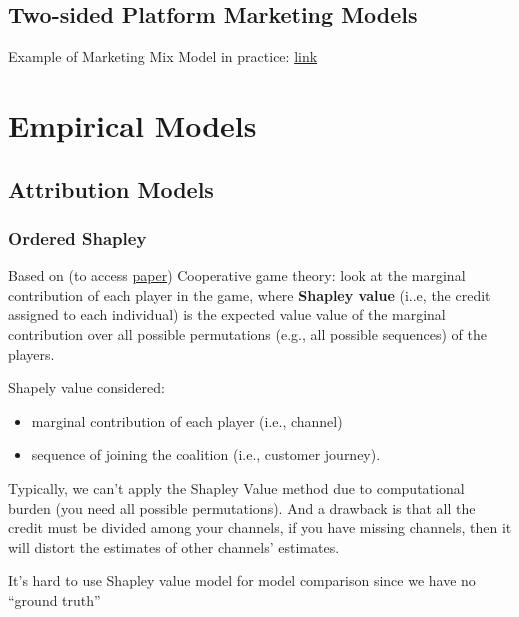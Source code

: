 \documentclass[
]{book}
\providecommand{\tightlist}{%
  \setlength{\itemsep}{0pt}\setlength{\parskip}{0pt}}
\begin{document}
\hypertarget{two-sided-platform-marketing-models}{%
\section{Two-sided Platform Marketing Models}\label{two-sided-platform-marketing-models}}

Example of Marketing Mix Model in practice: \href{http://datafeedtoolbox.com/marketing-mix-model-for-all-using-r-for-mmm/}{link}

\hypertarget{empirical-models}{%
\chapter{Empirical Models}\label{empirical-models}}

\hypertarget{attribution-models}{%
\section{Attribution Models}\label{attribution-models}}

\hypertarget{ordered-shapley}{%
\subsection{Ordered Shapley}\label{ordered-shapley}}

Based on \citep{Zhao_2018} (to access \href{https://arxiv.org/ftp/arxiv/papers/1804/1804.05327.pdf}{paper}) Cooperative game theory: look at the marginal contribution of each player in the game, where \textbf{Shapley value} (i..e, the credit assigned to each individual) is the expected value value of the marginal contribution over all possible permutations (e.g., all possible sequences) of the players.

Shapely value considered:

\begin{itemize}
\tightlist
\item
  marginal contribution of each player (i.e., channel)
\item
  sequence of joining the coalition (i.e., customer journey).
\end{itemize}

Typically, we can't apply the Shapley Value method due to computational burden (you need all possible permutations). And a drawback is that all the credit must be divided among your channels, if you have missing channels, then it will distort the estimates of other channels' estimates.

It's hard to use Shapley value model for model comparison since we have no ``ground truth''
\end{document}
